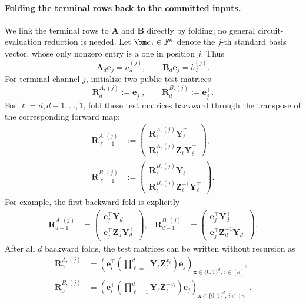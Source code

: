 \documentclass[runningheads]{llncs}
\begin{document}
\paragraph{Folding the terminal rows back to the committed inputs.}
We link the terminal rows to \(\bm A\) and \(\bm B\) directly by
folding; no general circuit-evaluation reduction is needed.  Let
\(\bm e_j\in\Field^\kappa\) denote the \(j\)-th standard basis vector,
whose only nonzero entry is a one in position \(j\).  Thus
\[
    \bm A_d\bm e_j=a_d^{(j)},
    \qquad
    \bm B_d\bm e_j=b_d^{(j)}.
\]
For terminal channel \(j\), initialize two public test matrices
\[
    \bm R_d^{A,(j)}:=\bm e_j^\top,
    \qquad
    \bm R_d^{B,(j)}:=\bm e_j^\top.
\]
For \(\ell=d,d-1,\ldots,1\), fold these test matrices backward through
the transpose of the corresponding forward map:
\begin{equation}
\begin{aligned}
    \bm R_{\ell-1}^{A,(j)}
      &:={}
      \begin{pmatrix}
        \bm R_\ell^{A,(j)}\bm Y_\ell^\top\\
        \bm R_\ell^{A,(j)}\bm Z_\ell\bm Y_\ell^\top
      \end{pmatrix},\\
    \bm R_{\ell-1}^{B,(j)}
      &:={}
      \begin{pmatrix}
        \bm R_\ell^{B,(j)}\bm Y_\ell^\top\\
        \bm R_\ell^{B,(j)}\bm Z_\ell^{-1}\bm Y_\ell^\top
      \end{pmatrix}.
\end{aligned}
\label{eq:wht-adjoint-folds}
\end{equation}
For example, the first backward fold is explicitly
\[
\begin{aligned}
    \bm R_{d-1}^{A,(j)}
      &=
      \begin{pmatrix}
        \bm e_j^\top\bm Y_d^\top\\
        \bm e_j^\top\bm Z_d\bm Y_d^\top
      \end{pmatrix},
    &
    \bm R_{d-1}^{B,(j)}
      &=
      \begin{pmatrix}
        \bm e_j^\top\bm Y_d^\top\\
        \bm e_j^\top\bm Z_d^{-1}\bm Y_d^\top
      \end{pmatrix}.
\end{aligned}
\]
After all \(d\) backward folds, the test matrices can be written
without recursion as
\begin{equation}
\begin{aligned}
    \bm R_0^{A,(j)}
      &=
      \left(
        \bm e_i^\top
        \left(
          \prod_{\ell=1}^{d}
            \bm Y_\ell\bm Z_\ell^{x_\ell}
        \right)
        \bm e_j
      \right)_{
        \bm x\in\{0,1\}^d,\,i\in[\kappa]
      },\\
    \bm R_0^{B,(j)}
      &=
      \left(
        \bm e_i^\top
        \left(
          \prod_{\ell=1}^{d}
            \bm Y_\ell\bm Z_\ell^{-x_\ell}
        \right)
        \bm e_j
      \right)_{
        \bm x\in\{0,1\}^d,\,i\in[\kappa]
      }.
\end{aligned}
\label{eq:wht-explicit-test-matrices}
\end{equation}
\end{document}
